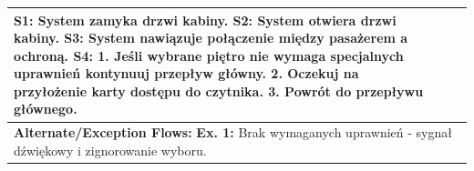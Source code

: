 \documentclass[12pt,a4paper]{article}
\begin{document}
\begin{table}[h!]
\begin{tabular}{|p{}|p{}|p{}|}
{\textbf{S1:} System zamyka drzwi kabiny. \newline
\textbf{S2:} System otwiera drzwi kabiny. \newline
\textbf{S3:} System nawiązuje połączenie między pasażerem a ochroną. \newline
\textbf{S4:} 1. Jeśli wybrane piętro nie wymaga specjalnych uprawnień kontynuuj przepływ główny. \newline
             \hspace*{20pt} 2. Oczekuj na przyłożenie karty dostępu do czytnika. \newline
             \hspace*{20pt} 3. Powrót do przepływu głównego. \newline
} \\ \hline
\multicolumn{3}{|p{0.9\textwidth}|}{\textbf{Alternate/Exception Flows:} \newline
\textbf{Ex. 1:} Brak wymaganych uprawnień - sygnał dźwiękowy i zignorowanie wyboru.} \\ \hline
\end{tabular}
\end{table}

\newpage
\end{document}

